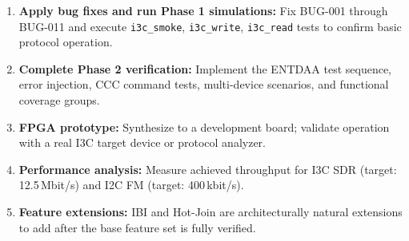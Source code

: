 \documentclass[12pt, a4paper, oneside]{report}
\begin{document}
\begin{enumerate}
  \item \textbf{Apply bug fixes and run Phase 1 simulations:} Fix BUG-001 through
        BUG-011 and execute \texttt{i3c\_smoke}, \texttt{i3c\_write},
        \texttt{i3c\_read} tests to confirm basic protocol operation.

  \item \textbf{Complete Phase 2 verification:} Implement the ENTDAA test sequence,
        error injection, CCC command tests, multi-device scenarios, and functional
        coverage groups.

  \item \textbf{FPGA prototype:} Synthesize to a development board; validate operation
        with a real I3C target device or protocol analyzer.

  \item \textbf{Performance analysis:} Measure achieved throughput for I3C SDR
        (target: 12.5\,Mbit/s) and I2C FM (target: 400\,kbit/s).

  \item \textbf{Feature extensions:} IBI and Hot-Join are architecturally natural
        extensions to add after the base feature set is fully verified.
\end{enumerate}
\end{document}
